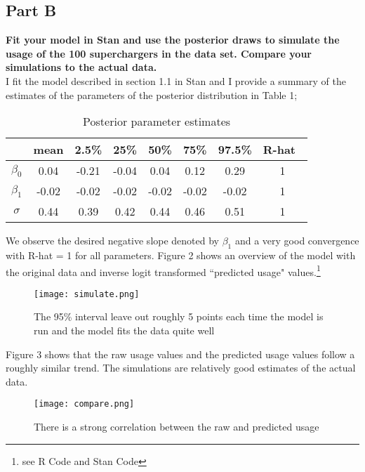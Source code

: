 \documentclass{article}
\begin{document}
\subsection{Part B}
\textbf{Fit your model in Stan and use the posterior draws to simulate the usage of the 100 superchargers in the data set. Compare your simulations to the actual data.}\\
I fit the model described in section 1.1 in Stan and I provide a summary of the estimates of the parameters of the posterior distribution in Table 1;
\begin{table}[H]
\caption {Posterior parameter estimates}
\vspace{2mm}
\centering \begin{tabular}{c c c c c c c c} 
\hline\hline 
\vspace{1mm}
& mean & 2.5\% &  25\% &  50\% &  75\% & 97.5\% & R-hat\ \\ [0.5ex] 
\hline 
$\beta_0$ & 0.04 & -0.21 & -0.04 & 0.04 & 0.12 & 0.29 & 1 \\ 
$\beta_1$ & -0.02 & -0.02 & -0.02 &-0.02 & -0.02 & -0.02 & 1 \\
$\sigma$ & 0.44 & 0.39 & 0.42 & 0.44 & 0.46 & 0.51 & 1 \\ [1ex] \hline 
\end{tabular}
\end{table}
We observe the desired negative slope denoted by $\beta_1$ and a very good convergence with R-hat = 1 for all parameters. Figure 2 shows an overview of the model with the original data and inverse logit transformed ``predicted usage" values.\footnote{see R Code and Stan Code}
\begin{figure}[H]
\centering
\texttt{[image: simulate.png]}
\caption{The 95\% interval leave out roughly 5 points each time the model is run and the model fits the data quite well}
\label{deltat}
\end{figure}
Figure 3 shows that the raw usage values and the predicted usage values follow a roughly similar trend. The simulations are relatively good estimates of the actual data.
\begin{figure}[H]
\centering
\texttt{[image: compare.png]}
\caption{There is a strong correlation between the raw and predicted usage}
\label{deltat}
\end{figure}
\end{document}
